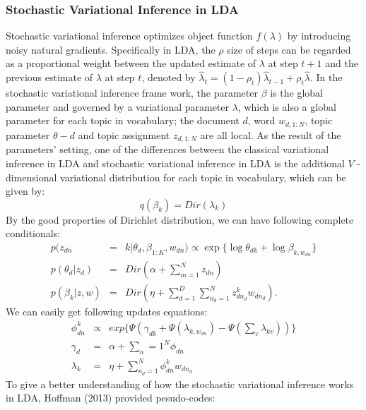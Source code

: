 \documentclass{article}
\begin{document}
\subsubsection{Stochastic Variational Inference in LDA}
Stochastic variational inference optimizes object function $f(\lambda)$ by introducing noisy natural gradients. Specifically in LDA, the $\rho$ size of steps can be regarded as a proportional weight between the updated estimate of $\lambda$ at step $t+1$ and the previous estimate of $\lambda$ at step $t$, denoted by $\hat{\lambda}_{t}=(1-\rho_t)\hat{\lambda}_{t-1}+\rho_t\hat{\lambda}$. In the stochastic variational inference frame work, the parameter $\beta$ is the global parameter and governed by a variational parameter $\lambda$, which is also a global parameter for each topic in vocabulary; the document $d$, word $w_{d,1:N}$, topic parameter $\theta-d$ and topic assignment $z_{d,1:N}$ are all local. As the result of the parameters' setting, one of the differences between the classical variational inference in LDA and stochastic variational inference in LDA is the additional $V$ -dimensional variational distribution for each topic in vocabulary, which can be given by:\\ 
\[
q(\beta_k)=Dir(\lambda_k)
\]
By the good properties of Dirichlet distribution, we can have following complete conditionals:\\
\begin{eqnarray*}
	p(z_{dn}&=&k|\theta_d,\beta_{1:K},w_{dn})\propto \exp \{\log \theta_{dk}+\log\beta_{k,w_{dn}}\}\\
	p(\theta_d|z_d) &=& Dir(\alpha+\sum_{m=1}^Nz_{dn})\\
	p(\beta_k|z,w)&=& Dir(\eta+\sum_{d=1}^D \sum_{n_d=1}^N z_{dn_d}^k w_{dn_d}).
\end{eqnarray*}
We can easily get following updates equations:\\
\begin{eqnarray*}
	\phi_{dn}^k &\propto& exp\{ \Psi(\gamma_{dk}+\Psi(\lambda_{k,w_{dn}})-\Psi(\sum_v\lambda_{kv}))\}\\
	\gamma_d &=&\alpha+\sum_n=1^N \phi_{dn}\\
	\lambda_k &=& \eta+ \sum_{n_d=1}^N \phi_{dn}^k w_{dn_d}
\end{eqnarray*}
To give a better understanding of how the stochastic variational inference works in LDA, Hoffman (2013) provided pesudo-codes:\\
\end{document}
